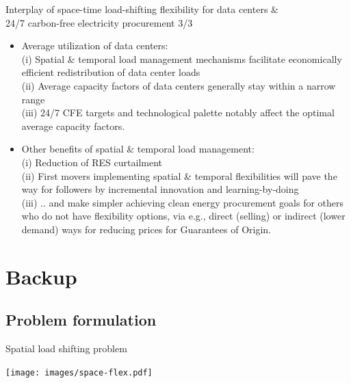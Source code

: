 \begin{frame}{Interplay of space-time load-shifting flexibility for data centers \& \\ 
  24/7 carbon-free electricity procurement 3/3}

{\footnotesize
\begin{itemize}

  \item Average utilization of data centers:\\
        (i) Spatial \& temporal load management mechanisms facilitate \alert{economically efficient redistribution} of data center loads \\
        (ii) Average capacity factors of data centers generally stay within a narrow range \\
        (iii) 24/7 CFE targets and technological palette notably affect the optimal average capacity factors.

  \item Other benefits of spatial \& temporal load management: \\
        (i) \alert{Reduction of RES curtailment} \\
        (ii) First movers implementing spatial \& temporal flexibilities will \alert{pave the way for followers} by incremental innovation and learning-by-doing \\
        (iii) .. and make \alert{simpler achieving clean energy procurement goals for others} who do not have flexibility options, via e.g., 
        direct (selling) or indirect (lower demand) ways for reducing prices for Guarantees of Origin.

\end{itemize}
}

\end{frame}



\section{Backup}
\subsection{Problem formulation}


\begin{frame}{Spatial load shifting problem}

  \centering
  \texttt{[image: images/space-flex.pdf]}
  
\end{frame}

